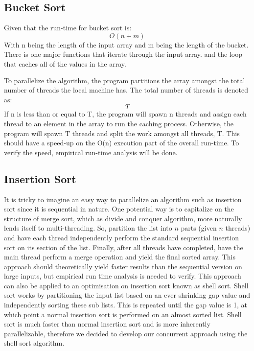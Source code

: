 \documentclass{article}
\begin{document}
\subsection{Bucket Sort}
Given that the run-time for bucket sort is: \[ O(n + m) \] With n being the length of the input array and m being the length of the bucket. There is one major functions that iterate through the input array. and the loop that caches all of the values in the array.

To parallelize the algorithm, the program partitions the array amongst the total number of threads the local machine has. The total number of threads is denoted as: \[T\] If n is less than or equal to T, the program will spawn n threads and assign each thread to an element in the array to run the caching process. Otherwise, the program will spawn T threads and split the work amongst all threads, T. This should have a speed-up on the O(n) execution part of the overall run-time. To verify the speed, empirical run-time analysis will be done.

\subsection{Insertion Sort}
It is tricky to imagine an easy way to parallelize an algorithm such as insertion sort since it is sequential in nature. One potential way is to capitalize on the structure of merge sort, which as divide and conquer algorithm, more naturally lends itself to multi-threading. So, partition the list into $n$ parts (given $n$ threads) and have each thread independently perform the standard sequential insertion sort on its section of the list. Finally, after all threads have completed, have the main thread perform a merge operation and yield the final sorted array. This approach should theoretically yield faster results than the sequential version on large inputs, but empirical run time analysis is needed to verify. This approach can also be applied to an optimisation on insertion sort known as shell sort. Shell sort works by partitioning the input list based on an ever shrinking gap value and independently sorting these sub lists. This is repeated until the gap value is 1, at which point a normal insertion sort is performed on an almost sorted list. Shell sort is much faster than normal insertion sort and is more inherently parallelizable, therefore we decided to develop our concurrent approach using the shell sort algorithm. 
\end{document}
